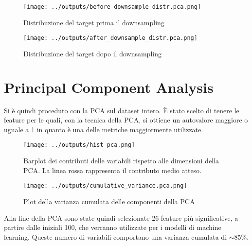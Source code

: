 \begin{figure}[!htb]
    \begin{minipage}{0.48\textwidth}
      \centering
      \texttt{[image: ../outputs/before\_downsample\_distr.pca.png]}
      \caption{Distribuzione del target prima il downsampling}
      \label{Fig:Data1}
    \end{minipage}\hfill
    \begin{minipage}{0.48\textwidth}
      \centering
      \texttt{[image: ../outputs/after\_downsample\_distr.pca.png]}
      \caption{Distribuzione del target dopo il downsampling}
      \label{Fig:Data2}
    \end{minipage}
\end{figure}

\section{Principal Component Analysis}
Si è quindi proceduto con la PCA sul dataset intero. È stato scelto di tenere 
le feature per le quali, con la tecnica della PCA, si ottiene un autovalore
maggiore o uguale a 1 in quanto è una delle metriche maggiormente utilizzate.
\begin{figure}[H]
    \centering
    \texttt{[image: ../outputs/hist\_pca.png]}
    \caption{Barplot dei contributi delle variabili rispetto alle dimensioni 
    della PCA. La linea rossa rappresenta il contributo medio atteso.}
\end{figure}
\begin{figure}[H]
    \centering
    \texttt{[image: ../outputs/cumulative\_variance.pca.png]}
    \caption{Plot della varianza cumulata delle componenti della PCA} 
\end{figure}
Alla fine della PCA sono state quindi selezionate 26 feature più significative,
a partire dalle iniziali 100, che verranno utilizzate per i modelli di machine 
learning. Queste numero di variabili comportano una varianza cumulata di 
$\sim 85\%$.